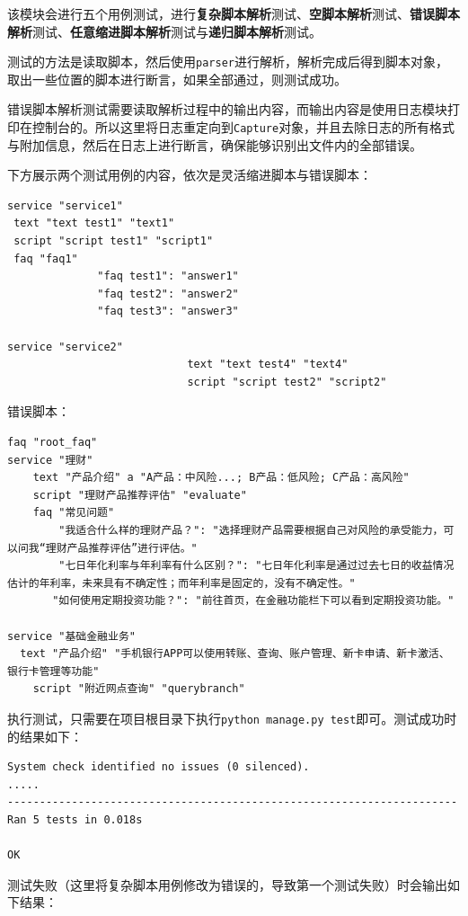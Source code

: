 \documentclass[hyperref]{ctexart}
\begin{document}
该模块会进行五个用例测试，进行{\bf 复杂脚本解析}测试、{\bf 空脚本解析}测试、{\bf 错误脚本解析}测试、{\bf 任意缩进脚本解析}测试与{\bf 递归脚本解析}测试。
\par 测试的方法是读取脚本，然后使用\texttt{parser}进行解析，解析完成后得到脚本对象，取出一些位置的脚本进行断言，如果全部通过，则测试成功。
\par 错误脚本解析测试需要读取解析过程中的输出内容，而输出内容是使用日志模块打印在控制台的。所以这里将日志重定向到\texttt{Capture}对象，并且去除日志的所有格式与附加信息，然后在日志上进行断言，确保能够识别出文件内的全部错误。
\par 下方展示两个测试用例的内容，依次是灵活缩进脚本与错误脚本：
\begin{lstlisting}
service "service1"
 text "text test1" "text1"
 script "script test1" "script1"
 faq "faq1"
              "faq test1": "answer1"
              "faq test2": "answer2"
              "faq test3": "answer3"

service "service2"
                            text "text test4" "text4"
                            script "script test2" "script2"

\end{lstlisting}
错误脚本：
\begin{lstlisting}
faq "root_faq"
service "理财"
    text "产品介绍" a "A产品：中风险...; B产品：低风险; C产品：高风险"
    script "理财产品推荐评估" "evaluate"
    faq "常见问题"
        "我适合什么样的理财产品？": "选择理财产品需要根据自己对风险的承受能力，可以问我“理财产品推荐评估”进行评估。"
        "七日年化利率与年利率有什么区别？": "七日年化利率是通过过去七日的收益情况估计的年利率，未来具有不确定性；而年利率是固定的，没有不确定性。"
       "如何使用定期投资功能？": "前往首页，在金融功能栏下可以看到定期投资功能。"

service "基础金融业务"
  text "产品介绍" "手机银行APP可以使用转账、查询、账户管理、新卡申请、新卡激活、银行卡管理等功能"
    script "附近网点查询" "querybranch"

\end{lstlisting}
\par 执行测试，只需要在项目根目录下执行\texttt{python manage.py test}即可。测试成功时的结果如下：
\begin{lstlisting}
System check identified no issues (0 silenced).
.....
----------------------------------------------------------------------
Ran 5 tests in 0.018s

OK
\end{lstlisting}
测试失败（这里将复杂脚本用例修改为错误的，导致第一个测试失败）时会输出如下结果：
\end{document}
